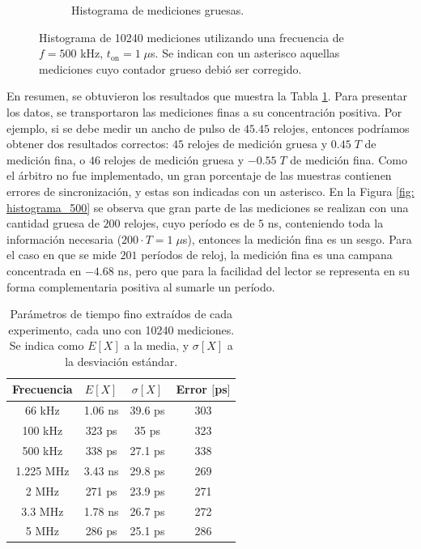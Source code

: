 \begin{figure}[H]
\begin{subfigure}[t]{0.45\textwidth}
{           }
           \caption{Histograma de mediciones gruesas.}
     \end{subfigure}
     \caption{Histograma de 10240 mediciones utilizando una frecuencia de $f=500$ kHz, $t_{\text{on}}=1 \; \mu$s. 
     Se indican con un asterisco aquellas mediciones cuyo contador grueso debió ser corregido.}
\end{figure}


En resumen, se obtuvieron los resultados que muestra la Tabla \ref{tabla: res_med_1}. Para presentar los datos, se
transportaron las mediciones finas a su concentración positiva. Por ejemplo, si se debe medir un ancho de pulso
de $45.45$ relojes, entonces podríamos obtener dos resultados correctos: $45$ relojes de medición gruesa y $0.45 \; T$
de medición fina, o $46$ relojes de medición gruesa y $-0.55 \; T$ de medición fina. Como el árbitro no fue
implementado, un gran porcentaje de las muestras contienen errores de sincronización, y estas son indicadas
con un asterisco. En la Figura \ref{fig: histograma_500} se observa que gran parte de las mediciones
se realizan con una cantidad gruesa de $200$ relojes, cuyo período es de $5$ ns, conteniendo toda 
la información necesaria ($200 \cdot T = 1 \; \mu$s), entonces la medición fina es un sesgo. Para el caso en que se mide
$201$ períodos de reloj, la medición fina es una campana concentrada en $-4.68$ ns, pero que para la facilidad del lector
se representa en su forma complementaria positiva al sumarle un período.

\begin{table}[!htpb]
     \centering
     \begin{tabular}{cccc}
     \hline
     Frecuencia         & $E[X]$   & $ \sigma[X]$ & Error $[$ps$]$ \\ \hline
     66 kHz             & 1.06 ns  & 39.6 ps      & 303            \\ \hline
     100 kHz            & 323 ps   & 35 ps        & 323            \\ \hline
     500 kHz            & 338 ps   & 27.1 ps      & 338            \\ \hline
     1.225 MHz          & 3.43 ns  & 29.8 ps      & 269            \\ \hline
     2 MHz              & 271 ps   & 23.9 ps      & 271            \\ \hline
     3.3 MHz            & 1.78 ns  & 26.7 ps      & 272            \\ \hline
     5 MHz              & 286 ps   & 25.1 ps      & 286            \\ \hline
     \end{tabular}
     \caption{Parámetros de tiempo fino extraídos de cada experimento, cada uno con 10240 mediciones.
     Se indica como $E[X]$ a la media, y $\sigma[X]$ a la desviación estándar.}
     \label{tabla: res_med_1}
\end{table}


